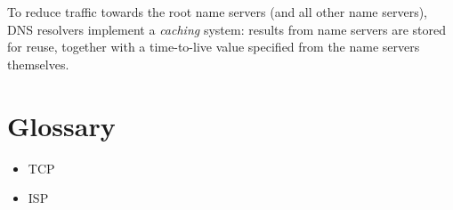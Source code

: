 \documentclass[mscthesis]{usiinfthesis}
\begin{document}
To reduce traffic towards the root name servers (and all other name servers), DNS resolvers implement a \emph{caching} system: results from name servers are stored for reuse, together with a time-to-live value specified from the name servers themselves. 

\backmatter

\chapter{Glossary}
\begin{itemize}
	\item TCP
	\item ISP
	
\end{itemize}

%
%


\end{document}
